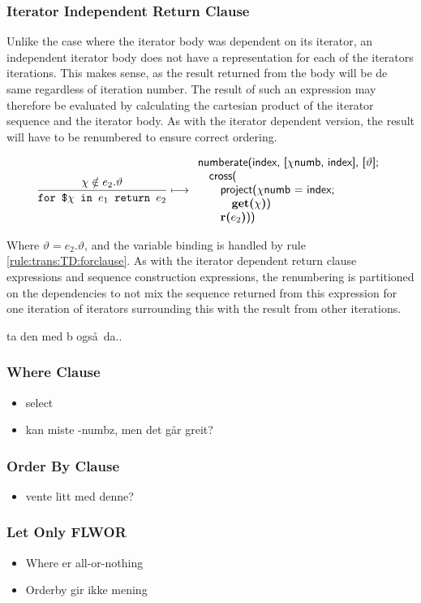 \subsubsection{Iterator Independent Return Clause}
Unlike the case where the iterator body was dependent on its iterator, an independent iterator body does not have
a representation for each of the iterators iterations. This makes sense, as the result returned from the body will
be de same regardless of iteration number. The result of such an expression may therefore be evaluated by
calculating the cartesian product of the iterator sequence and the iterator body. As with the iterator dependent
version, the result will have to be renumbered to ensure correct ordering.

\begin{equation}
\frac{\chi \notin e_{2}.\vartheta}{\mbox{\texttt{for \$}}\chi\mbox{\texttt{ in }}e_{1}\mbox{\texttt{ return
}}e_{2}}\longmapsto
\begin{array}{l}
\mbox{\textsf{numberate(index, [}}\chi\mbox{\textsf{numb, index], [}}\vartheta\mbox{\textsf{];}} \\ \quad
\mbox{\textsf{cross(}} \\ \quad \quad
\mbox{\textsf{project(}}\chi\mbox{\textsf{numb = index; }} \\ \quad \quad \quad
\mbox{\textbf{get(}}\chi\mbox{\textbf{)}\textsf{)}} \\ \quad \quad
\mbox{\textbf{r(}}e_{2}\mbox{\textbf{)}\textsf{))}}
\end{array}
\label{rule:trans:TD:indepForRet}
\end{equation}

Where $\vartheta = e_{2}.\vartheta$, and the variable binding is handled by rule \ref{rule:trans:TD:forclause}. As
with the iterator dependent return clause expressions and sequence construction expressions, the renumbering is
partitioned on the dependencies to not mix the sequence returned from this expression for one iteration of
iterators surrounding this with the result from other iterations.

\noindent
\begin{myExample}
ta den med b ogs\aa~da..
\end{myExample}

\subsubsection{Where Clause}
\begin{itemize}
  \item select
  \item kan miste -numbz, men det g\aa r greit?
\end{itemize}

\subsubsection{Order By Clause}
\begin{itemize}
  \item vente litt med denne?
\end{itemize}


\subsubsection{Let Only FLWOR}
\begin{itemize}
  \item Where er all-or-nothing
  \item Orderby gir ikke mening
\end{itemize}
